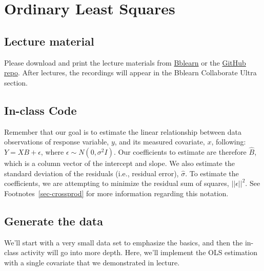\documentclass[
  letterpaper,
  DIV=11,
  numbers=noendperiod]{scrreprt}
\begin{document}

\hypertarget{sec-ols}{%
\chapter{Ordinary Least Squares}\label{sec-ols}}

\hypertarget{lecture-material-1}{%
\section{Lecture material}\label{lecture-material-1}}

Please download and print the lecture materials from
\href{https://bblearn.nau.edu/}{Bblearn} or the
\href{https://github.com/joseph-mihaljevic/inf511-book/tree/main/lecture-material}{GitHub
repo}. After lectures, the recordings will appear in the Bblearn
Collaborate Ultra section.

\hypertarget{in-class-code}{%
\section*{In-class Code}\label{in-class-code}}


Remember that our goal is to estimate the linear relationship between
data observations of response variable, \(y\), and its measured
covariate, \(x\), following: \(Y = XB + \epsilon\), where
\(\epsilon \sim N(0, \sigma^2 I).\) Our coefficients to estimate are
therefore \(\hat{B}\), which is a column vector of the intercept and
slope. We also estimate the standard deviation of the residuals (i.e.,
residual error), \(\hat{\sigma}\). To estimate the coefficients, we are
attempting to minimize the residual sum of squares,
\(|| \epsilon || ^ 2\). See Footnotes~\ref{sec-crossprod} for more
information regarding this notation.

\hypertarget{generate-the-data}{%
\section{Generate the data}\label{generate-the-data}}

We'll start with a very small data set to emphasize the basics, and then
the in-class activity will go into more depth. Here, we'll implement the
OLS estimation with a single covariate that we demonstrated in lecture.
\end{document}
